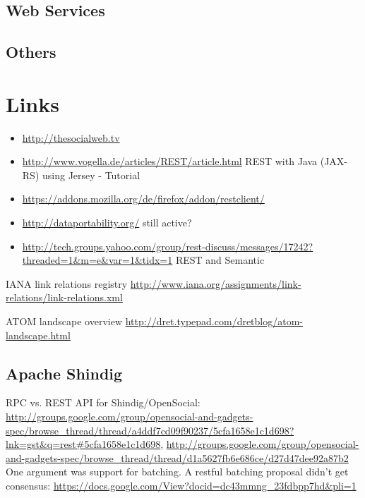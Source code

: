 \documentclass[12pt,a4paper]{scrartcl}		%
\begin{document}
\subsection{Web Services}

\subsection{Others}

\section{Links}

\begin{itemize}
\item \url{http://thesocialweb.tv}
\item \url{http://www.vogella.de/articles/REST/article.html} REST with Java (JAX-RS) using Jersey - Tutorial
\item \url{https://addons.mozilla.org/de/firefox/addon/restclient/}
\item \url{http://dataportability.org/} still active?
\item \url{http://tech.groups.yahoo.com/group/rest-discuss/messages/17242?threaded=1&m=e&var=1&tidx=1} REST and Semantic

\end{itemize}

IANA link relations registry \url{http://www.iana.org/assignments/link-relations/link-relations.xml}

ATOM landscape overview \url{http://dret.typepad.com/dretblog/atom-landscape.html}

\subsection{Apache Shindig}
RPC vs. REST API for Shindig/OpenSocial: \url{http://groups.google.com/group/opensocial-and-gadgets-spec/browse_thread/thread/a4ddf7cd09f90237/5cfa1658e1c1d698?lnk=gst&q=rest#5cfa1658e1c1d698}, \url{http://groups.google.com/group/opensocial-and-gadgets-spec/browse_thread/thread/d1a5627fb6e686ce/d27d47dee92a87b2} One argument was support for batching. A restful batching proposal didn't get consensus: \url{https://docs.google.com/View?docid=dc43mmng_23fdbpp7hd&pli=1}
\end{document}
